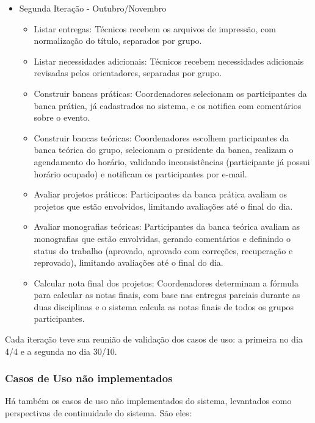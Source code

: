 \begin{itemize}
    \item Segunda Iteração - Outubro/Novembro
    \begin{itemize}
        \item Listar entregas: Técnicos recebem os arquivos de impressão, com normalização do título, separados por grupo.
        \item Listar necessidades adicionais: Técnicos recebem necessidades adicionais revisadas pelos orientadores, separadas por grupo.
        \item Construir bancas práticas: Coordenadores selecionam os participantes da banca prática, já cadastrados no sistema, e os notifica com comentários sobre o evento.
        \item Construir bancas teóricas: Coordenadores escolhem participantes da banca teórica do grupo, selecionam o presidente da banca, realizam o agendamento do horário, validando inconsistências (participante já possui horário ocupado) e notificam os participantes por e-mail.
        \item Avaliar projetos práticos: Participantes da banca prática avaliam os projetos que estão envolvidos, limitando avaliações até o final do dia.
        \item Avaliar monografias teóricas: Participantes da banca teórica avaliam as monografias que estão envolvidas, gerando comentários e definindo o status do trabalho (aprovado, aprovado com correções, recuperação e reprovado), limitando avaliações até o final do dia.
        \item Calcular nota final dos projetos: Coordenadores determinam a fórmula para calcular as notas finais, com base nas entregas parciais durante as duas disciplinas e o sistema calcula as notas finais de todos os grupos participantes.
    \end{itemize}
\end{itemize}

Cada iteração teve sua reunião de validação dos casos de uso: a primeira no dia 4/4 e a segunda no dia 30/10.

\subsubsection{Casos de Uso não implementados}
Há também os casos de uso não implementados do sistema, levantados como perspectivas de continuidade do sistema. São eles:

